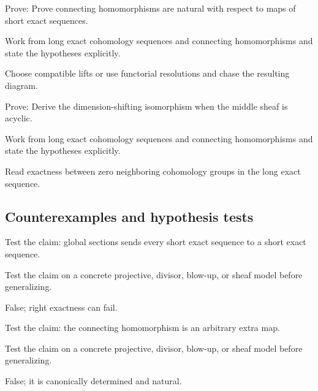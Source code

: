 \begin{exercise}[Naturality]\label{exr:vi48-expand-08}
Prove: Prove connecting homomorphisms are natural with respect to maps of short exact sequences.
\end{exercise}
\begin{hint}
Work from long exact cohomology sequences and connecting homomorphisms and state the hypotheses explicitly.
\end{hint}
\begin{solution}
Choose compatible lifts or use functorial resolutions and chase the resulting diagram.
\end{solution}

\begin{exercise}\label{exr:vi48-expand-09}
Prove: Derive the dimension-shifting isomorphism when the middle sheaf is acyclic.
\end{exercise}
\begin{hint}
Work from long exact cohomology sequences and connecting homomorphisms and state the hypotheses explicitly.
\end{hint}
\begin{solution}
Read exactness between zero neighboring cohomology groups in the long exact sequence.
\end{solution}

\subsection*{Counterexamples and hypothesis tests}

\begin{exercise}[H0 exact]\label{exr:vi48-expand-10}
Test the claim: global sections sends every short exact sequence to a short exact sequence.
\end{exercise}
\begin{hint}
Test the claim on a concrete projective, divisor, blow-up, or sheaf model before generalizing.
\end{hint}
\begin{solution}
False; right exactness can fail.
\end{solution}

\begin{exercise}\label{exr:vi48-expand-11}
Test the claim: the connecting homomorphism is an arbitrary extra map.
\end{exercise}
\begin{hint}
Test the claim on a concrete projective, divisor, blow-up, or sheaf model before generalizing.
\end{hint}
\begin{solution}
False; it is canonically determined and natural.
\end{solution}

